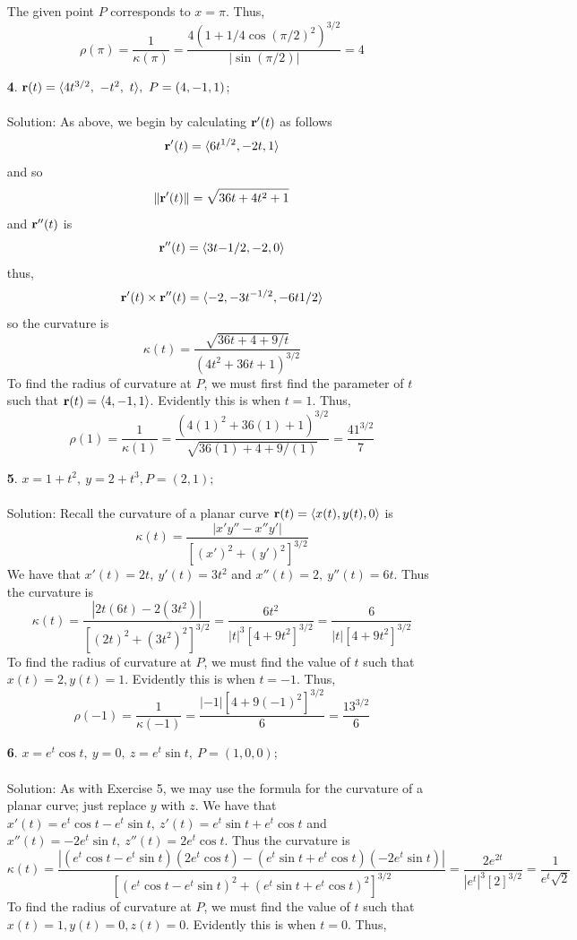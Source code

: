 \documentclass[12pt]{amsbook}
\newcommand{\la}{\langle}
\newcommand{\ra}{\rangle}
\begin{document}
\begin{enumerate}
   The given point $P$ corresponds to $x=\pi$. Thus,
  $$\rho(\pi)=\frac{1}{\kappa(\pi)}=\frac{4(1+1/4\cos(\pi/2)^2)^{3/2}}{|\sin(\pi/2)|}=4$$
  \item[{\small\bf 4}.] ${\bf r}(t)=\la 4t^{3/2},\ -t^2,\ t\ra, \ P=(4,-1,1)$;
  \\
  \\
  {\sc Solution}: As above, we begin by calculating ${\bf r}'(t)$ as follows
  $${\bf r}'(t)=\la 6t^{1/2}, -2t,1 \ra$$
  and so 
  $$\|{\bf r}'(t)\|=\sqrt{36t+4t^2+1}$$
  and ${\bf r}''(t)$ is
  $${\bf r}''(t)=\la 3t{-1/2}, -2, 0\ra$$
  thus,
  $${\bf r}'(t)\times{\bf r}''(t)=\la -2,-3t^{-1/2},-6t{1/2} \ra$$
  so the curvature is
  $$\kappa(t)=\frac{\sqrt{36t+4+9/t}}{(4t^2+36t+1)^{3/2}}$$
  To find the radius of curvature at $P$, we must first find the parameter of $t$ such that ${\bf r}(t)=\la 4,-1,1 \ra$. Evidently this is when $t=1$. Thus,
  $$\rho(1)=\frac{1}{\kappa(1)}=\frac{(4(1)^2+36(1)+1)^{3/2}}{\sqrt{36(1)+4+9/(1)}}=\frac{41^{3/2}}{7}$$
  \item[{\small\bf 5}.] $x=1+t^2, \ y=2+t^3, P=(2,1)$;
  \\
  \\
  {\sc Solution}: Recall the curvature of a planar curve ${\bf r}(t)=\la x(t),y(t),0 \ra$ is
  $$\kappa(t)=\frac{|x'y''-x''y'|}{[(x')^2+(y')^2]^{3/2}}$$
  We have that $x'(t)=2t, \ y'(t)=3t^2$ and $x''(t)=2, \ y''(t)=6t$. Thus the curvature is
  $$\kappa(t)=\frac{|2t(6t)-2(3t^2)|}{[(2t)^2+(3t^2)^2]^{3/2}}=\frac{6t^2}{|t|^3[4+9t^2]^{3/2}}=\frac{6}{|t|[4+9t^2]^{3/2}}$$
  To find the radius of curvature at $P$, we must find the value of $t$ such that $x(t)=2, y(t)=1$. Evidently this is when $t=-1$. Thus,
  $$\rho(-1)=\frac{1}{\kappa(-1)}=\frac{|-1|[4+9(-1)^2]^{3/2}}{6}=\frac{13^{3/2}}{6}$$
  \item[{\small\bf 6}.] $x=e^t\cos t, \ y=0, \ z=e^t\sin t, \ P=(1,0,0)$;
  \\
  \\
  {\sc Solution}: As with Exercise 5, we may use the formula for the curvature of a planar curve; just replace $y$ with $z$. We have that $x'(t)=e^t\cos t -e^t\sin t, \ z'(t)=e^t\sin t+e^t\cos t$ and $x''(t)=-2e^t\sin t, \ z''(t)=2e^t\cos t$. Thus the curvature is
  $$\kappa(t)=\frac{|(e^t\cos t -e^t\sin t)(2e^t\cos t)-(e^t\sin t+e^t\cos t)(-2e^t\sin t)|}{[(e^t\cos t -e^t\sin t)^2+(e^t\sin t+e^t\cos t)^2]^{3/2}}=\frac{2e^{2t}}{|e^t|^3[2]^{3/2}}=\frac{1}{e^t\sqrt{2}}$$
  To find the radius of curvature at $P$, we must find the value of $t$ such that $x(t)=1, y(t)=0, z(t)=0$. Evidently this is when $t=0$. Thus,

\end{enumerate}
\end{document}
